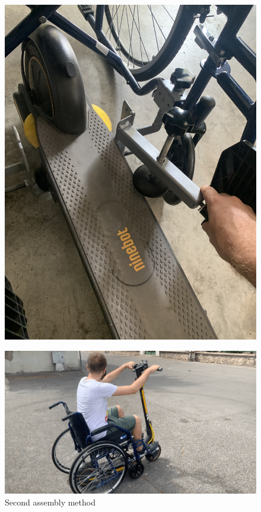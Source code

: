 \documentclass[binding=0.6cm,LaM,noexaminfo]{sapthesis}
\begin{document}
\begin{figure}[!htp]
\begin{minipage}[t]{.5\textwidth}
    \centering\includegraphics[width=.95\textwidth]{images/finished_project/IMG_3763.jpg}
    \end{minipage}
\end{figure}

\newpage
\begin{figure}[!htp]
    \centering
    \includegraphics[width=.9\textwidth]{images/finished_project/IMG_2333.png}
    \caption{Second assembly method}
    \label{fig:second_ass_method2}
\end{figure}
\end{document}
